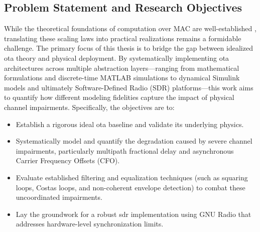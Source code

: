 \documentclass[Markos_Delaportas_1316.tex]{subfiles}
\begin{document}
\subsection{Problem Statement and Research Objectives}
While the theoretical foundations of computation over MAC are well-established
\cite{nazer_reliable_nodate, goldenbaum_analyzing_2011}, translating
these scaling
laws into practical realizations remains a formidable challenge. The
primary focus of this
thesis is to bridge the gap between idealized \gls{ota} theory and
physical deployment. By
systematically implementing \gls{ota} architectures across multiple
abstraction layers---ranging
from mathematical formulations and discrete-time MATLAB simulations
to dynamical Simulink
models and ultimately Software-Defined Radio (SDR) platforms---this
work aims to quantify
how different modeling fidelities capture the impact of physical
channel impairments.
Specifically, the objectives are to:
\begin{itemize}
    \item Establish a rigorous ideal \gls{ota} baseline and validate
        its underlying physics.
    \item Systematically model and quantify the degradation caused by
        severe channel impairments, particularly multipath fractional
        delay and asynchronous Carrier Frequency Offsets (CFO).
    \item Evaluate established filtering and equalization techniques
        (such as squaring loops, Costas loops, and non-coherent
        envelope detection) to combat these uncoordinated impairments.
    \item Lay the groundwork for a robust \gls{sdr} implementation
        using GNU Radio that addresses hardware-level synchronization limits.
\end{itemize}
\end{document}
